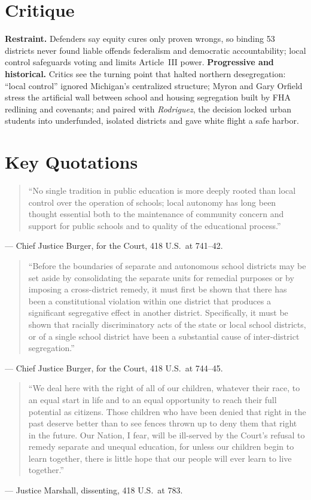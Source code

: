 \documentclass[12pt]{article}
\begin{document}
\section{Critique}

\textbf{Restraint.} Defenders say equity cures only proven wrongs, so binding 53 districts never found liable offends federalism and democratic accountability; local control safeguards voting and limits Article~III power. \textbf{Progressive and historical.} Critics see the turning point that halted northern desegregation: ``local control'' ignored Michigan's centralized structure; Myron and Gary Orfield stress the artificial wall between school and housing segregation built by FHA redlining and covenants; and paired with \textit{Rodriguez}, the decision locked urban students into underfunded, isolated districts and gave white flight a safe harbor.

\section{Key Quotations}

\begin{quote}
``No single tradition in public education is more deeply rooted than local control over the operation of schools; local autonomy has long been thought essential both to the maintenance of community concern and support for public schools and to quality of the educational process.''
\end{quote}
\noindent --- Chief Justice Burger, for the Court, 418 U.S.\ at 741--42.

\begin{quote}
``Before the boundaries of separate and autonomous school districts may be set aside by consolidating the separate units for remedial purposes or by imposing a cross-district remedy, it must first be shown that there has been a constitutional violation within one district that produces a significant segregative effect in another district. Specifically, it must be shown that racially discriminatory acts of the state or local school districts, or of a single school district have been a substantial cause of inter-district segregation.''
\end{quote}
\noindent --- Chief Justice Burger, for the Court, 418 U.S.\ at 744--45.

\begin{quote}
``We deal here with the right of all of our children, whatever their race, to an equal start in life and to an equal opportunity to reach their full potential as citizens. Those children who have been denied that right in the past deserve better than to see fences thrown up to deny them that right in the future. Our Nation, I fear, will be ill-served by the Court's refusal to remedy separate and unequal education, for unless our children begin to learn together, there is little hope that our people will ever learn to live together.''
\end{quote}
\noindent --- Justice Marshall, dissenting, 418 U.S.\ at 783.
\end{document}
